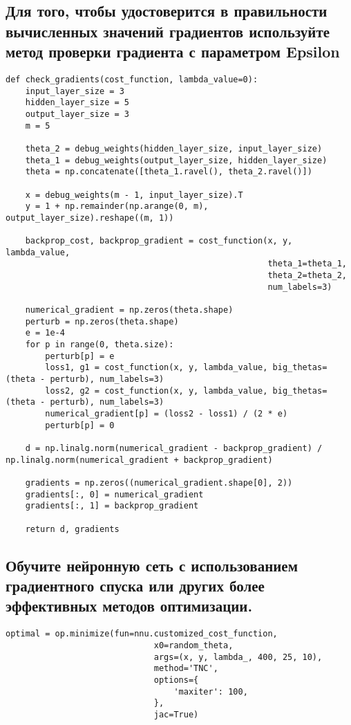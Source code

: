 \subsection{Для того, чтобы удостоверится в правильности вычисленных значений градиентов используйте метод проверки градиента с параметром Epsilon}

\begin{lstlisting}
def check_gradients(cost_function, lambda_value=0):
    input_layer_size = 3
    hidden_layer_size = 5
    output_layer_size = 3
    m = 5

    theta_2 = debug_weights(hidden_layer_size, input_layer_size)
    theta_1 = debug_weights(output_layer_size, hidden_layer_size)
    theta = np.concatenate([theta_1.ravel(), theta_2.ravel()])

    x = debug_weights(m - 1, input_layer_size).T
    y = 1 + np.remainder(np.arange(0, m), output_layer_size).reshape((m, 1))

    backprop_cost, backprop_gradient = cost_function(x, y, lambda_value,
                                                     theta_1=theta_1,
                                                     theta_2=theta_2,
                                                     num_labels=3)

    numerical_gradient = np.zeros(theta.shape)
    perturb = np.zeros(theta.shape)
    e = 1e-4
    for p in range(0, theta.size):
        perturb[p] = e
        loss1, g1 = cost_function(x, y, lambda_value, big_thetas=(theta - perturb), num_labels=3)
        loss2, g2 = cost_function(x, y, lambda_value, big_thetas=(theta - perturb), num_labels=3)
        numerical_gradient[p] = (loss2 - loss1) / (2 * e)
        perturb[p] = 0

    d = np.linalg.norm(numerical_gradient - backprop_gradient) / np.linalg.norm(numerical_gradient + backprop_gradient)

    gradients = np.zeros((numerical_gradient.shape[0], 2))
    gradients[:, 0] = numerical_gradient
    gradients[:, 1] = backprop_gradient

    return d, gradients
\end{lstlisting}

\subsection{Обучите нейронную сеть с использованием градиентного спуска или других более эффективных методов оптимизации.}

\begin{lstlisting}
optimal = op.minimize(fun=nnu.customized_cost_function,
                              x0=random_theta,
                              args=(x, y, lambda_, 400, 25, 10),
                              method='TNC',
                              options={
                                  'maxiter': 100,
                              },
                              jac=True)
\end{lstlisting}

